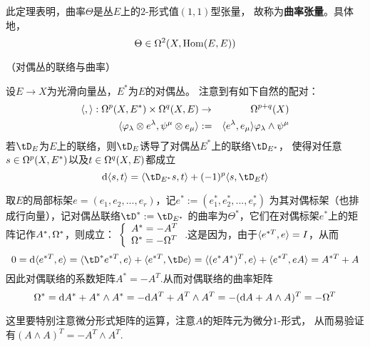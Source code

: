 \begin{rem}
此定理表明，曲率$\Theta$是丛$E$上的$2$-形式值$(1,1)$型张量，
故称为\textbf{曲率张量}。具体地，
$$\Theta\in\Omega^2(X,\operatorname{Hom}(E,E))$$
\end{rem}


\begin{Example}（对偶丛的联络与曲率）

设$E\to X$为光滑向量丛，$E^*$为$E$的对偶丛。
注意到有如下自然的配对：
\begin{eqnarray*}
     \langle , \rangle:
     \Omega^p(X,E^*)\times\Omega^q(X,E)
     &\to&\Omega^{p+q}(X)
\\
     \langle \varphi_\lambda\otimes e^\lambda,\psi^\mu\otimes e_\mu \rangle
&:=&
     \langle e^{\lambda},e_\mu \rangle
     \varphi_\lambda\wedge\psi^\mu     
\end{eqnarray*}
若$\tD_E$为$E$上的联络，则$\tD_E$诱导了对偶丛$E^*$上的联络$\tD_{E^*}$，
使得对任意$s\in\Omega^p(X,E^*)$以及$t\in\Omega^q(X,E)$都成立
$$
  \td\pair{s}{t}
=
  \pair{\tD_{E^*}s}{t}
 +(-1)^p\pair{s}{\tD_E t}
$$
\end{Example}

取$E$的局部标架$e=(e_1,e_2,...,e_r)$，记$e^*:=(e_1^*,e_2^*,...,e_r^*)$
为其对偶标架（也排成行向量），记对偶丛联络$\tD^*:=\tD_{E^*}$
的曲率为$\Theta^*$，它们在对偶标架$e^*$上的矩阵记作$A^*,\Omega^*$，则成立：
$
  \left\{
    \begin{array}{l}
      A^*=-A^T\\
      \Omega^*=-\Omega^T
    \end{array}
  \right.
$.这是因为，由于$\langle e^{*T},e \rangle=I$，从而
$$
  0=\td\pair{e^{*T}}{e}
=\pair{\tD^* e^{*T}}{e}+\pair{e^{*T}}{\tD e}
=\pair{(e^*A^*)^T}{e}+\pair{e^{*T}}{eA}
=A^{*T}+A
$$
因此对偶联络的系数矩阵$A^*=-A^T$.从而对偶联络的曲率矩阵
$$
  \Omega^*=\mathrm{d} A^*+A^*\wedge A^*
        =-\mathrm{d} A^T+A^T\wedge A^T
        =-(\mathrm{d} A+A\wedge A)^T
        =-\Omega^T
$$

这里要特别注意微分形式矩阵的运算，注意$A$的矩阵元为微分$1$-形式，
从而易验证有$(A\wedge A)^T=-A^T\wedge A^T$.


